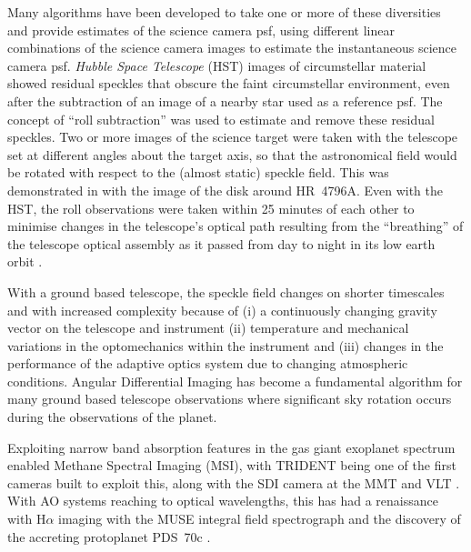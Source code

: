 \documentclass[letterpaper]{ar-1col}
\begin{document}
Many algorithms have been developed to take one or more of these diversities and provide estimates of the science camera \ac{psf}, using different linear combinations of the science camera images to estimate the instantaneous science camera \ac{psf}.
%
{\it Hubble Space Telescope} (HST) images of circumstellar material showed residual speckles that obscure the faint circumstellar environment, even after the subtraction of an image of a nearby star used as a reference \ac{psf}.
%
The concept of ``roll subtraction''  \citep{Schneider98} was used to estimate and remove these residual speckles.
%
Two or more images of the science target were taken with the telescope set at different angles about the target axis, so that the astronomical field would be rotated with respect to the (almost static) speckle field.
%
This was demonstrated in \citet{Schneider99} with the image of the disk around HR~4796A.
%
Even with the HST, the roll observations were taken within 25 minutes of each other to minimise changes in the telescope's optical path resulting from the ``breathing'' of the telescope optical assembly as it passed from day to night in its low earth orbit \citep{Bely93}.

With a ground based telescope, the speckle field changes on shorter timescales and with increased complexity because of (i) a continuously changing gravity vector on the telescope and instrument (ii) temperature and mechanical variations in the optomechanics within the instrument and (iii) changes in the performance of the adaptive optics system due to changing atmospheric conditions.
%
Angular Differential Imaging \citep[ADI; ][]{Marois06} has become a fundamental algorithm for many ground based telescope observations where significant sky rotation occurs during the observations of the planet.

Exploiting narrow band absorption features in the gas giant exoplanet spectrum enabled Methane Spectral Imaging (MSI), with TRIDENT \citep{Marois05} being one of the first cameras built to exploit this, along with the SDI camera at the MMT and VLT \citep{Biller07-1}.
%
With AO systems reaching to optical wavelengths, this has had a renaissance with H$\alpha$ imaging with the MUSE integral field spectrograph and the discovery of the accreting protoplanet PDS~70c \citep{Haffert19}.
\end{document}

